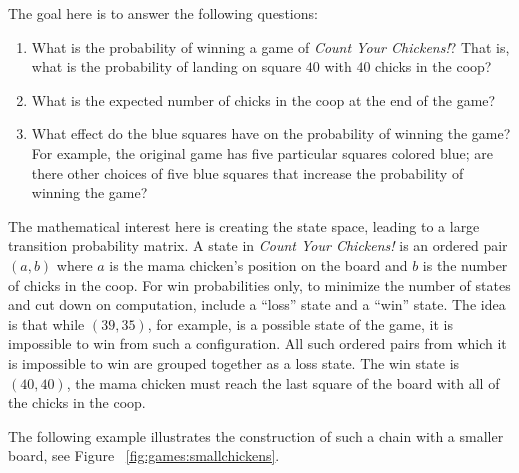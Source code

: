 \documentclass[12pt]{article}
\begin{document}
The goal here is to answer the following questions:
\begin{enumerate}
    \item
        What is the probability of winning a game of \emph{Count Your
        Chickens!}?  That is, what is the probability of landing on
        square \( 40 \) with \( 40 \) chicks in the coop?
    \item
        What is the expected number of chicks in the coop at the end of
        the game?
    \item
        What effect do the blue squares have on the probability of
        winning the game?  For example, the original game has five
        particular squares colored blue; are there other choices of five
        blue squares that increase the probability of winning the game?
\end{enumerate}

The mathematical interest here is creating the state space, leading to a
large transition probability matrix.  A state in \emph{Count Your
Chickens!} is an ordered pair \( (a, b) \) where \( a \) is the mama
chicken’s position on the board and \( b \) is the number of chicks in
the coop.  For win probabilities only, to minimize the number of states
and cut down on computation, include a ``loss'' state and a ``win''
state.  The idea is that while \( (39, 35) \), for example, is a
possible state of the game, it is impossible to win from such a
configuration.  All such ordered pairs from which it is impossible to
win are grouped together as a loss state.  The win state is \( (40, 40) \),
the mama chicken must reach the last square of the board with all of the
chicks in the coop.

The following example illustrates the construction of such a chain with
a smaller board, see Figure~%
\ref{fig:games:smallchickens}.
\end{document}
